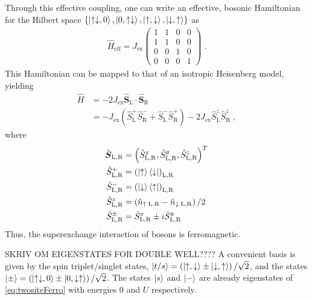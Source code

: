 Through this effective coupling, one can write an effective, bosonic Hamiltonian for the Hilbert space $\{ \ket{\uparrow \downarrow, 0} , \ket{0, \uparrow \downarrow} , \ket{\uparrow,\downarrow} , \ket{\downarrow,\uparrow} \}$ as
\begin{align}
\hat{H}_{\mathrm{eff}} = J_{\mathrm{ex}} \begin{pmatrix}
           1 & 1 & 0 & 0 \\
           1 & 1 & 0 & 0 \\
           0 & 0 & 1 & 0 \\
           0 & 0 & 0 & 1 
         \end{pmatrix} \; .
\end{align}
This Hamiltonian can be mapped to that of an isotropic Heisenberg model, yielding
\begin{align}
	\hat{H} &= -2 J_{\mathrm{ex}} \hat{\boldsymbol{S}}_{\mathrm{L}} \cdot \hat{\boldsymbol{S}}_{\mathrm{R}} \nonumber \\
	&= - J_{\mathrm{ex}} \left( \hat{S}_{\mathrm{L}}^{+} \hat{S}_{\mathrm{R}}^{-} + \hat{S}_{\mathrm{L}}^{-} \hat{S}_{\mathrm{R}}^{+} \right) - 2 J_{\mathrm{ex}} \hat{S}_{\mathrm{L}}^{z} \hat{S}_{\mathrm{R}}^{z} \; , \label{eq:twositeFerro}
\end{align}
where 
\begin{align*}
\hat{\boldsymbol{S}}_{\mathrm{L,R}} &= \left(  \hat{S}_{\mathrm{L,R}}^{x} , \hat{S}_{\mathrm{L,R}}^{y} , \hat{S}_{\mathrm{L,R}}^{z} \right)^{T} \\
\hat{S}_{\mathrm{L},\mathrm{R}}^{+} &= \left( \ket{\uparrow}\bra{\downarrow} \right)_{\mathrm{L},\mathrm{R}} \\
\hat{S}_{\mathrm{L},\mathrm{R}}^{-} &= \left( \ket{\downarrow}\bra{\uparrow} \right)_{\mathrm{L},\mathrm{R}} \\
\hat{S}_{\mathrm{L},\mathrm{R}}^{z} &= \left( \hat{n}_{\uparrow \; \mathrm{L},\mathrm{R}} - \hat{n}_{\downarrow \; \mathrm{L},\mathrm{R}} \right)/2 \\
\hat{S}_{\mathrm{L},\mathrm{R}}^{\pm} &= \hat{S}_{\mathrm{L},\mathrm{R}}^{x} \pm i \hat{S}_{\mathrm{L},\mathrm{R}}^{y}
\end{align*}
Thus, the superexchange interaction of bosons is ferromagnetic.

SKRIV OM EIGENSTATES FOR DOUBLE WELL????
A convenient basis is given by the spin triplet/singlet states, $\ket{t/s} = \left( \ket{\uparrow,\downarrow} \pm \ket{\downarrow,\uparrow}  \right)/\sqrt{2}$, and the states $\ket{\pm} = \left( \ket{\uparrow \downarrow ,0} \pm \ket{0 , \downarrow \uparrow}  \right)/\sqrt{2}$. The states $\ket{s}$ and $\ket{-}$ are already eigenstates of \eqref{eq:twositeFerro} with energies $0$ and $U$ respectively.  


